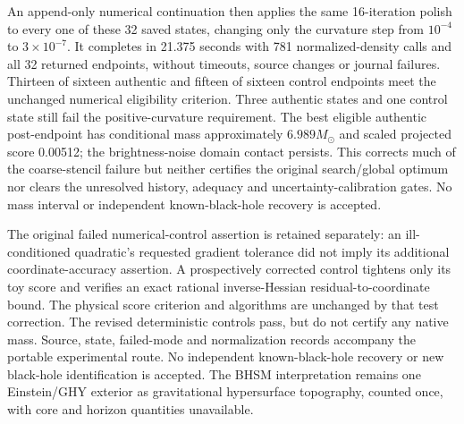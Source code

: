 An append-only numerical continuation then applies the same 16-iteration
polish to every one of these 32 saved states, changing only the curvature
step from $10^{-4}$ to $3\times10^{-7}$. It completes in 21.375 seconds
with 781 normalized-density calls and all 32 returned endpoints, without
timeouts, source changes or journal failures. Thirteen of sixteen authentic
and fifteen of sixteen control endpoints meet the unchanged numerical
eligibility criterion. Three authentic states and one control state still
fail the positive-curvature requirement. The best eligible authentic
post-endpoint has conditional mass approximately $6.989M_\odot$ and
scaled projected score 0.00512; the brightness-noise domain contact
persists. This corrects much of the coarse-stencil failure but neither
certifies the original search/global optimum nor clears the unresolved
history, adequacy and uncertainty-calibration gates. No mass interval or
independent known-black-hole recovery is accepted.

The original failed numerical-control assertion is retained separately:
an ill-conditioned quadratic's requested gradient tolerance did not
imply its additional coordinate-accuracy assertion. A prospectively
corrected control tightens only its toy score and verifies an exact
rational inverse-Hessian residual-to-coordinate bound. The physical
score criterion and algorithms are unchanged by that test correction.
The revised deterministic controls pass, but do not certify any native
mass. Source, state, failed-mode and normalization records accompany the
portable experimental route. No independent known-black-hole recovery
or new black-hole identification is accepted. The BHSM interpretation
remains one Einstein/GHY exterior as gravitational hypersurface
topography, counted once, with core and horizon quantities unavailable.

